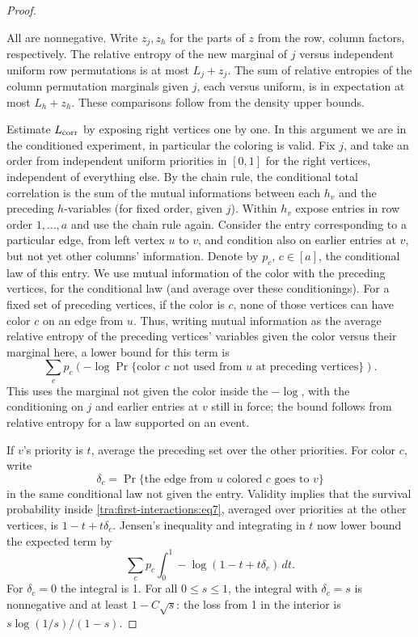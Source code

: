 \begin{proof}
\begin{itemize}
\end{itemize}
All are nonnegative. Write \(z_j,z_h\) for the parts of \(z\) from the row, column factors, respectively. The relative entropy of the new marginal of \(j\) versus independent uniform row permutations is at most \(L_j+z_j\). The sum of relative entropies of the column permutation marginals given \(j\), each versus uniform, is in expectation at most \(L_h+z_h\). These comparisons follow from the density upper bounds.

Estimate \(L_{\rm corr}\) by exposing right vertices one by one. In this argument we are in the conditioned experiment, in particular the coloring is valid. Fix \(j\), and take an order from independent uniform priorities in \([0,1]\) for the right vertices, independent of everything else. By the chain rule, the conditional total correlation is the sum of the mutual informations between each \(h_v\) and the preceding \(h\)-variables (for fixed order, given \(j\)). Within \(h_v\) expose entries in row order \(1,\ldots,a\) and use the chain rule again. Consider the entry corresponding to a particular edge, from left vertex \(u\) to \(v\), and condition also on earlier entries at \(v\), but not yet other columns' information. Denote by \(p_c\), \(c\in[a]\), the conditional law of this entry. We use mutual information of the color with the preceding vertices, for the conditional law (and average over these conditionings). For a fixed set of preceding vertices, if the color is \(c\), none of those vertices can have color \(c\) on an edge from \(u\). Thus, writing mutual information as the average relative entropy of the preceding vertices' variables given the color versus their marginal here, a lower bound for this term is
\begin{equation}
             \sum_c p_c \left(-\log\Pr\{\text{color }c
                           \text{ not used from }u\text{ at preceding vertices}\}\right).\label{tra:first-interactions:eq7}
\end{equation}
This uses the marginal not given the color inside the \(-\log\), with the conditioning on \(j\) and earlier entries at \(v\) still in force; the bound follows from relative entropy for a law supported on an event.

If \(v\)'s priority is \(t\), average the preceding set over the other priorities. For color \(c\), write
\[
  \delta_c=\Pr\{\text{the edge from }u\text{ colored }c\text{ goes to }v\}
\]
in the same conditional law not given the entry. Validity implies that the survival probability inside \eqref{tra:first-interactions:eq7}, averaged over priorities at the other vertices, is \(1-t+t\delta_c\). Jensen's inequality and integrating in \(t\) now lower bound the expected term by
\begin{equation}
                           \sum_c p_c \int_0^1 -\log(1-t+t\delta_c)\,dt.\label{tra:first-interactions:eq8}
\end{equation}
For \(\delta_c=0\) the integral is 1. For all \(0\le s\le1\), the integral with \(\delta_c=s\) is nonnegative and at least \(1-C\sqrt s\): the loss from 1 in the interior is \(s\log(1/s)/(1-s)\).


\end{proof}
